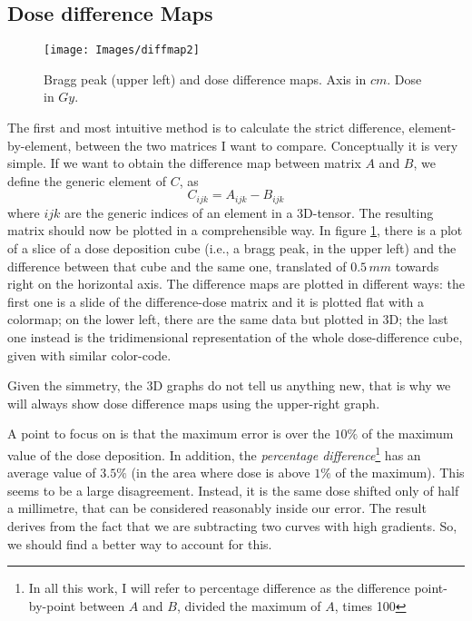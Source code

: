 \documentclass[12pt, a4paper, twoside]{book}
\begin{document}
\subsection{Dose difference Maps}
\begin{figure}[t!]
\texttt{[image: Images/diffmap2]}
\caption{Bragg peak (upper left) and dose difference maps. Axis in $cm$. Dose in $Gy$.}
\label{fig:diff}
\end{figure}
The first and most intuitive method is to calculate the strict difference, element-by-element, between the two matrices I want to compare. Conceptually it is very simple. If we want to obtain the difference map between matrix $A$ and $B$, we define the generic element of $C$, as
\[
C_{ijk} = A_{ijk} - B_{ijk}
\]
where $ijk$ are the generic indices of an element in a 3D-tensor.
The resulting matrix should now be plotted in a comprehensible way. In figure \ref{fig:diff}, there is a plot of a slice of a dose deposition cube (i.e., a bragg peak, in the upper left) and the difference between that cube and the same one, translated of $0.5\,mm$ towards right on the horizontal axis. 
The difference maps are plotted in different ways: the first one is a slide of the difference-dose matrix and it is plotted flat with a colormap; on the lower left, there are the same data but plotted in 3D; the last one instead is the tridimensional representation of the whole dose-difference cube, given with similar color-code.

Given the simmetry, the 3D graphs do not tell us anything new, that is why we will always show dose difference maps using the upper-right graph.

A point to focus on is that the maximum error is over the $10\%$ of the maximum value of the dose deposition. In addition, the \emph{percentage difference}\footnote{In all this work, I will refer to percentage difference as the difference point-by-point between $A$ and $B$, divided the maximum of $A$, times 100} has an average value of $3.5\%$ (in the area where dose is above $1\%$ of the maximum). 
This seems to be a large disagreement. Instead, it is the same dose shifted only of half a millimetre, that can be considered reasonably inside our error. The result derives from the fact that we are subtracting two curves with high gradients. So, we should find a better way to account for this.
\end{document}
